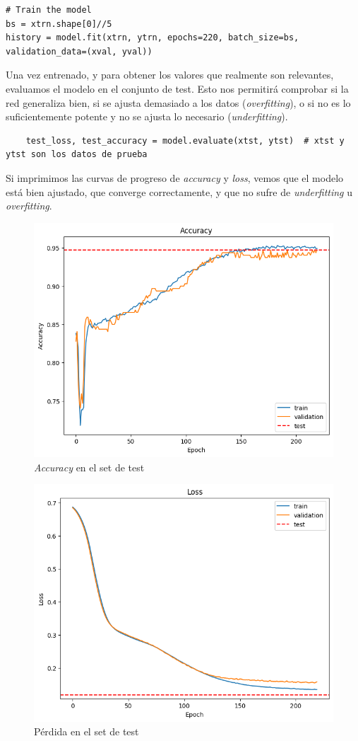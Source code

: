 \documentclass[paper=a4, fontsize=11pt]{scrartcl} %
\numberwithin{equation}{section} %
\numberwithin{figure}{section} %
\numberwithin{table}{section} %
\begin{document}
\begin{verbatim}
# Train the model
bs = xtrn.shape[0]//5
history = model.fit(xtrn, ytrn, epochs=220, batch_size=bs, validation_data=(xval, yval))
\end{verbatim}

Una vez entrenado, y para obtener los valores que realmente son relevantes, evaluamos el modelo en el conjunto de test. Esto nos permitirá comprobar si la red generaliza bien, si se ajusta demasiado a los datos (\textit{overfitting}), o si no es lo suficientemente potente y no se ajusta lo necesario (\textit{underfitting}).

\begin{verbatim}
    test_loss, test_accuracy = model.evaluate(xtst, ytst)  # xtst y ytst son los datos de prueba
\end{verbatim}

Si imprimimos las curvas de progreso de \textit{accuracy} y \textit{loss}, vemos que el modelo está bien ajustado, que converge correctamente, y que no sufre de \textit{underfitting} u \textit{overfitting}.


\begin{figure}[H]
  \centering
  \includegraphics[width=.6\linewidth]{images/accuracy_output.png}
  \caption{\textit{Accuracy} en el set de test}
  \label{fig:sub1}
\end{figure}

\begin{figure}[H]
  \centering
  \includegraphics[width=.6\linewidth]{images/loss_output.png}
  \caption{Pérdida en el set de test}
  \label{fig:sub2}
\end{figure}
\end{document}
